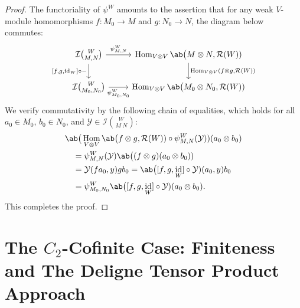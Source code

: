 \documentclass[12pt, english]{article}
\numberwithin{equation}{section}
\DeclareMathOperator{\Hom}{Hom}
\DeclareMathOperator{\id}{id}
\theoremstyle{plain}
\theoremstyle{definition}
\theoremstyle{remark}
\begin{document}
\begin{proof}
		\vspace{0.3cm}
		
		The functoriality of $\psi^W$ amounts to the assertion that for any weak $V$-module homomorphisms $f\colon M_0 \to M$ and $g\colon N_0 \to N$, the diagram below commutes:
		\[
		\begin{tikzcd}
			\mathcal{I}\binom{W}{M,N}
			\arrow[r,"{\psi^W_{M,N}}"]
			\arrow[d,"{[f,g,\id_{W}] \circ -}"']
			& \Hom_{V\otimes V} \ab\big(M\otimes N,\mathcal{R}(W))
			\arrow[d,"{\Hom_{V\otimes V}(f\otimes g,\mathcal{R}(W))}"] \\
			\mathcal{I}\binom{W}{M_0,N_0}
			\arrow[r,"{\psi^W_{M_0,N_0}}"']
			& \Hom_{V\otimes V} \ab\big(M_0\otimes N_0,\mathcal{R}(W))
		\end{tikzcd}
		\]
		We verify commutativity by the following chain of equalities, which holds for all $a_0 \in M_0$, $b_0 \in N_0$, and $\mathcal{Y} \in \mathcal{I}\binom{W}{M\;N}$:
		\begin{align*}
			& \ab\big(\Hom_{V\otimes V} \ab\big(f\otimes g, \mathcal{R}(W)) \circ \psi^W_{M, N}(\mathcal{Y})) (a_0\otimes b_0) \\
			& \quad = \psi^W_{M, N}(\mathcal{Y}) \ab\big((f\otimes g) (a_0\otimes b_0)) \\
			& \quad = \mathcal{Y}(fa_0, y) gb_0 = \ab\big([f, g, \id_{W}] \circ \mathcal{Y}) (a_0, y) b_0 \\
			& \quad = \psi^W_{M_0, N_0} \ab\big([f, g, \id_{W}] \circ \mathcal{Y}) (a_0\otimes b_0).
		\end{align*}
		This completes the proof.
		
	\end{proof}
	
	\section{ The \texorpdfstring{$C_2$}{C₂}-Cofinite Case: Finiteness and The Deligne Tensor Product Approach} \label{sec:c2-cofinite-case}
	
	
\end{document}
